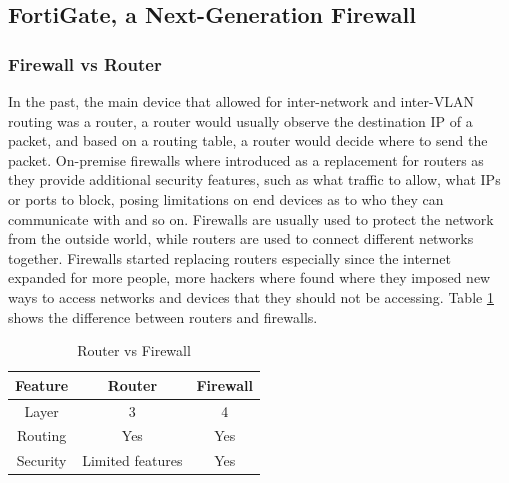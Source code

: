 \documentclass[12pt]{report}
\begin{document}
\subsection{FortiGate, a Next-Generation Firewall}
\subsubsection{Firewall vs Router}
In the past, the main device that allowed for inter-network and inter-VLAN routing was a router, a router would usually observe the destination IP of a packet, and based on a routing table, a router would decide where to send the packet. On-premise firewalls where introduced as a replacement for routers as they provide additional security features, such as what traffic to allow, what IPs or ports to block, posing limitations on end devices as to who they can communicate with and so on. Firewalls are usually used to protect the network from the outside world, while routers are used to connect different networks together. Firewalls started replacing routers especially since the internet expanded for more people, more hackers where found where they imposed new ways to access networks and devices that they should not be accessing. Table \ref{tab:router vs firewall} shows the difference between routers and firewalls. \cite{FWvsRout}

\begin{table}[h]
    \centering
    \begin{tabular}{|c|c|c|}
    \hline
    \textbf{Feature} & \textbf{Router} & \textbf{Firewall} \\ \hline
    Layer & 3 & 4 \\ \hline
    Routing & Yes & Yes \\ \hline
    Security & Limited features & Yes \\ \hline
    \end{tabular}
    \caption{Router vs Firewall}
    \label{tab:router vs firewall}
\end{table}
\end{document}
